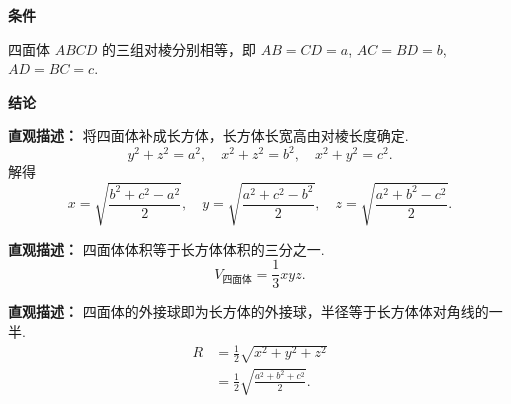 \begin{statementbox}

	\textbf{\textcolor{CStatement}{条件}}
	\begin{description}[style=nextline, leftmargin=2.8em, labelsep=0.5em, itemsep=0.35em]
		\item[\textbf{\textcolor{CStatement}{条件1（对棱相等）：}}] 四面体 $ABCD$ 的三组对棱分别相等，即 $AB=CD=a$, $AC=BD=b$, $AD=BC=c$.
	\end{description}

	\textbf{\textcolor{CStatement}{结论}}
	\begin{description}[style=nextline, leftmargin=2.8em, labelsep=0.5em, itemsep=0.45em]
		\item[\textbf{\textcolor{CStatement}{结论一（补形关系）：}}]
			\textbf{\textcolor{CStatement}{直观描述：}}
			将四面体补成长方体，长方体长宽高由对棱长度确定.
			\[
				y^2+z^2=a^2,\quad x^2+z^2=b^2,\quad x^2+y^2=c^2.
			\]
			解得
			\[
				x=\sqrt{\frac{b^2+c^2-a^2}{2}},\quad
				y=\sqrt{\frac{a^2+c^2-b^2}{2}},\quad
				z=\sqrt{\frac{a^2+b^2-c^2}{2}}.
			\]

		\item[\textbf{\textcolor{CStatement}{结论二（体积公式）：}}]
			\textbf{\textcolor{CStatement}{直观描述：}}
			四面体体积等于长方体体积的三分之一.
			\[
				V_{\text{四面体}}=\frac13 xyz.
			\]

		\item[\textbf{\textcolor{CStatement}{推广结论（外接球半径）：}}]
			\textbf{\textcolor{CStatement}{直观描述：}}
			四面体的外接球即为长方体的外接球，半径等于长方体体对角线的一半.
			\[
				\begin{aligned}
					R &= \frac12\sqrt{x^2+y^2+z^2} \\
					&= \frac12\sqrt{\frac{a^2+b^2+c^2}{2}}.
			\end{aligned}
			\]
	\end{description}

\end{statementbox}
